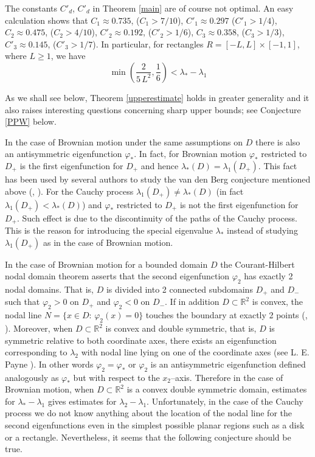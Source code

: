 \documentclass[11pt,leqno]{article}
\theoremstyle{definition}
\newcommand{\Rt}{\mathbb{R}^2}
\numberwithin{equation}{section}
\begin{document}
The constants $C'_d$, $C'_d$ in Theorem \ref{main} are of course not optimal. An easy
calculation shows that $C_1
\approx 0.735$, ($C_1 > 7/10$),
$C'_1 \approx 0.297$ ($C'_1 > 1/4$),
$C_2 \approx 0.475$, ($C_2 > 4/10$), 
 $C'_2 \approx 0.192$, ($C'_2 > 1/6$), $C_3 \approx 0.358$, ($C_3 > 1/3$), $C'_3 \approx 0.145$, ($C'_3 >
1/7$).  In particular, for rectangles $R = [-L,L] \times [-1,1]$, where $L \ge 1$, we have
$$
 \min \left( \frac{2}{5 \, L^2}, \frac{1}{6} \right)<\lambda_* - \lambda_1 
$$

 As we shall see below, Theorem \ref{upperestimate}  holds in greater generality 
and it also raises 
interesting questions concerning sharp upper bounds; see Conjecture \ref{PPW} below.
 

 In the case of  Brownian motion under the same
assumptions on $D$ there is  also an  antisymmetric eigenfunction
$\varphi_*$. In fact, for Brownian motion $\varphi_*$ restricted to
$D_+$ is  the first eigenfunction for $D_+$ and hence $\lambda_*(D) =
 \lambda_1(D_+)$. This fact has been used by several authors
to study  the van den Berg conjecture  mentioned above (\cite{BM}, \cite{Da}).   For the
Cauchy process
$\lambda_1(D_+)
\ne
\lambda_*(D)$ 
(in fact $\lambda_1(D_+) < \lambda_*(D)$) 
and
$\varphi_*$ restricted to $D_+$ is not the  first
eigenfunction for $D_+$. Such effect is due to the discontinuity of the paths of the 
Cauchy process. 
This is the reason for
introducing the special eigenvalue $\lambda_*$ instead of studying
$\lambda_1(D_+)$ as in the case of Brownian motion.  




In the case
 of Brownian motion for a bounded domain $D$ the
 Courant-Hilbert nodal domain theorem asserts that the second
 eigenfunction $\varphi_2$ has exactly 2 nodal domains. That is, $D$
 is divided into 2 connected subdomains $D_+$ and $D_-$ such that
 $\varphi_2 > 0$ on $D_+$ and $\varphi_2 < 0$ on $D_-$.
If in addition  $D \subset \Rt$ is convex,  the nodal
line $N =
 \{x \in D: \, \varphi_2(x) = 0\}$ touches the boundary at exactly 2
 points (\cite{M}, \cite{A}). Moreover, when $D \subset \Rt$ is convex 
 and double symmetric, that is, $D$ is symmetric relative to both
 coordinate axes,  there exists an  eigenfunction corresponding
 to $\lambda_2$ with nodal line lying on one of the coordinate axes
 (see L. E. Payne \cite{P1}). In other words $\varphi_2 = \varphi_*$
 or $\varphi_2$ is  an  antisymmetric eigenfunction defined
 analogously as $\varphi_*$ but with respect  to the $x_2$--axis. Therefore in
 the case of Brownian motion, when $D \subset \Rt$ is a convex double
 symmetric domain,
 estimates for $\lambda_* - \lambda_1$ gives estimates for $\lambda_2
 - \lambda_1$. 
Unfortunately,  in the case of the Cauchy
process we do not know anything about the location of 
  the nodal line for the second eigenfunctions even in the simplest possible planar regions
such as  a  disk or  a rectangle. Nevertheless, it seems that the
following conjecture should be true. 
\end{document}
